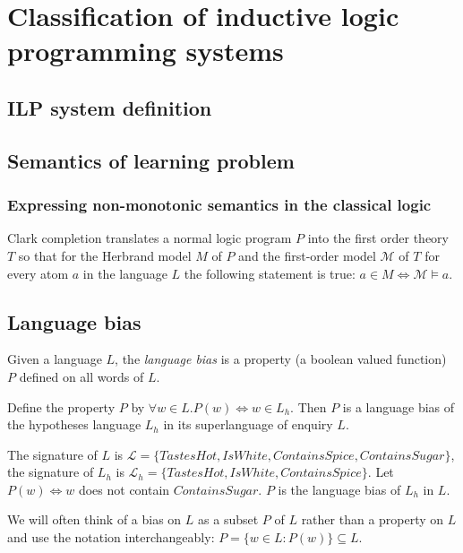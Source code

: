 \chapter{Classification of inductive logic programming systems}
\label{chap:classification_of_ilp_systems}

\section{ILP system definition}
\section{Semantics of learning problem}
\subsection{Expressing non-monotonic semantics in the classical logic}
Clark completion translates a normal logic program $P$ into the first order theory $T$ so that for the Herbrand model $M$ of $P$ and the first-order model $\mathcal{M}$ of $T$ for every atom $a$ in the language $L$ the following statement is true:
$a \in M \iff \mathcal{M} \models a$.

\section{Language bias}
\begin{defn}
Given a language $L$, the \emph{language bias} is a property (a boolean valued function) $P$ defined on all words of $L$.
\end{defn}

\begin{exmp}
Define the property $P$ by $\forall w \in L. P(w) \iff w \in L_h$. Then $P$ is a language bias of the hypotheses language $L_h$ in its superlanguage of enquiry $L$.
\end{exmp}

\begin{exmp}
The signature of $L$ is
$\mathcal{L}=\{TastesHot, IsWhite, ContainsSpice, ContainsSugar\}$,
the signature of $L_h$ is
$\mathcal{L}_h=\{TastesHot, IsWhite, ContainsSpice\}$.
Let $P(w) \iff w$ does not contain $ContainsSugar$. $P$ is the language bias of $L_h$ in $L$.
\end{exmp}

\begin{remark}
We will often think of a bias on $L$ as a subset $P$ of $L$ rather than a property on $L$ and use the notation interchangeably:
$P=\{w \in L : P(w)\} \subseteq L$.
\end{remark}

